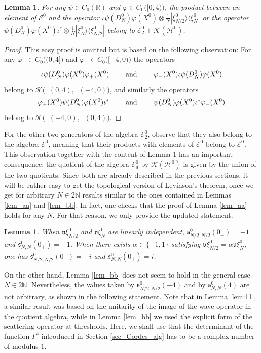 \documentclass[11pt]{article}
\def\EE{\mathscr E}
\def\Hrond{\mathscr H}
\def\K{\mathscr K}
\def\N{\mathbb N}
\def\R{\mathbb R}
\def\s{\mathfrak s}
\def\v{\mathfrak v}
\def\ltwo{\mathop{\mathrm{L}^2}\nolimits}
\newtheorem{Lemma}[Theorem]{Lemma}
\begin{document}
\begin{Lemma}\label{lem_product}
For any $\psi \in C_0(\R)$ and $\varphi \in C_0\big([0,4)\big)$, the product between an element of $\EE^0$
and the operator $\iota \psi(D^0_N)\varphi(X^0)\otimes \tfrac{1}{N}|\xi^0_{N/2}\rangle \langle \xi^0_N|$ or the operator $\psi(D^0_N)\varphi(X^0)\iota^* \otimes \tfrac{1}{N}|\xi^0_{N}\rangle \langle \xi^0_{N/2}|$
belong to $\EE^0_2 + \K(\Hrond^0)$.
\end{Lemma}

\begin{proof}
This easy proof is omitted but is based on the following observation: For any 
$\varphi_+\in C_0\big((0,4]\big)$ and $\varphi_-\in C_0\big([-4,0)\big)$ the operators
$$
\iota \psi(D^0_N)\varphi(X^0) \varphi_+(X^0)  \qquad \hbox{ and }\qquad 
\varphi_-(X^0)\iota \psi(D^0_N)\varphi(X^0)
$$
belong to $\K\big(\ltwo(0,4), \ltwo(-4,0)\big)$, and similarly
the operators 
$$
\varphi_+(X^0) \psi(D^0_N)\varphi(X^0)\iota^*
\qquad \hbox{ and }\qquad 
\psi(D^0_N)\varphi(X^0)\iota^*\varphi_-(X^0)
$$
belong to $\K\big(\ltwo(-4,0), \ltwo(0,4)\big)$.
\end{proof}

For the other two generators of the algebra $\EE^0_2$, observe that they also belong to the algebra $\EE^0$, meaning that their products with elements of $\EE^0$ belong to  $\EE^0$. This observation together with the content of Lemma \ref{lem_product}
has an important consequence: the quotient of the algebra $\EE^0_d$ by $\K(\Hrond^0)$
is given by the union of the two quotients. Since both are already described in the previous
sections, it will be rather easy to get the topological version of Levinson's theorem,
once we get for arbitrary $N\in 2\N$ results similar to the ones contained in Lemmas \ref{lem_aa} and \ref{lem_bb}. 
In fact, one checks that the proof of Lemma \ref{lem_aa} holds for any $N$. For that reason, we only provide the updated statement.

\begin{Lemma}
When $\v\xi^0_{N/2}$ and $\v\xi^0_{N}$ are linearly independent, 
 $\s^0_{N/2,N/2}(0_-) = -1$ and $\s^0_{N,N}(0_+) =  -1$. 
When there exists $\alpha\in \{-1,1\}$ satisfying $\v\xi^0_{N/2}=\alpha \v \xi^0_N$,
one has $\s^0_{N/2,N/2}(0_-) = -i$ and $\s^0_{N,N}(0_+) =  i$.
\end{Lemma} 

On the other hand, Lemma \ref{lem_bb} does not seem to hold in the general case
$N\in 2\N$. Nevertheless, the values taken by $\s^0_{N/2,N/2}(-4)$ and by 
$\s^0_{N,N}(4)$ are not arbitrary, as shown in the following statement. 
Note that in Lemma \ref{lem:11}, a similar result was based on the unitarity
of the image of the wave operator in the quotient algebra, while in Lemma \ref{lem_bb}
we used the explicit form of the scattering operator at thresholds. 
Here, we shall use that the determinant of the function $\Gamma^4$
introduced in Section \ref{sec_Cordes_alg} has to be a complex number of modulus $1$.
\end{document}
